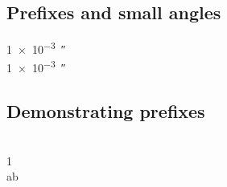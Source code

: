 \documentclass{article}
\begin{document}
\subsection{Prefixes and small angles}

{
\DeclareSIUnit{}
\qty{1e-3}{\arcsecond} \\
\qty[prefix-mode = combine-exponent]{1e-3}{\arcsecond}
}

%
%

\setcounter{subsection}{16}

\subsection{Demonstrating prefixes}
\unit{\yotta\noop} \\
\qty[prefix-mode = extract-exponent, print-unity-mantissa = false]{1}{\yotta\noop} \\
a\unit{\noop}b
\end{document}
